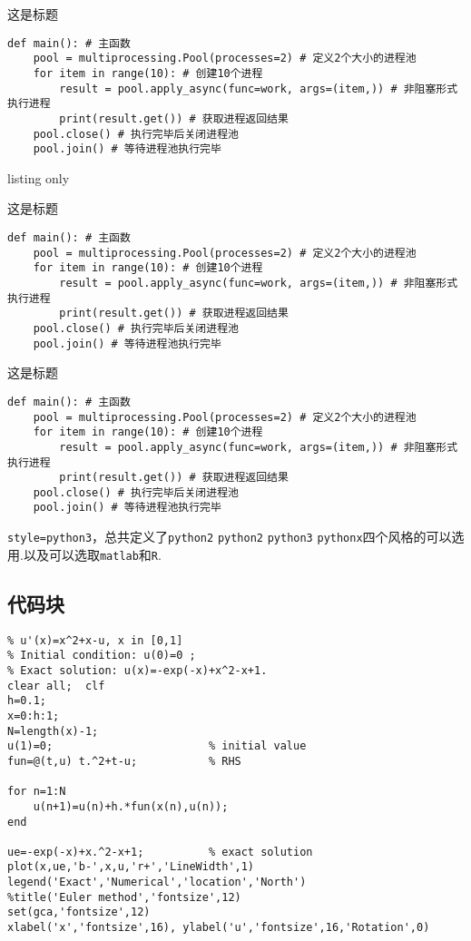 \documentclass[a4]{ctexart}
\begin{document}
\begin{macbox}{这是标题}
\begin{lstlisting}[style=python4]
def main(): # 主函数
    pool = multiprocessing.Pool(processes=2) # 定义2个大小的进程池
    for item in range(10): # 创建10个进程
        result = pool.apply_async(func=work, args=(item,)) # 非阻塞形式执行进程
        print(result.get()) # 获取进程返回结果
    pool.close() # 执行完毕后关闭进程池
    pool.join() # 等待进程池执行完毕
\end{lstlisting}
\end{macbox}

\begin{tcblisting}{listing only}
\begin{macboxd}{这是标题}
\begin{lstlisting}[style=python3]
def main(): # 主函数
    pool = multiprocessing.Pool(processes=2) # 定义2个大小的进程池
    for item in range(10): # 创建10个进程
        result = pool.apply_async(func=work, args=(item,)) # 非阻塞形式执行进程
        print(result.get()) # 获取进程返回结果
    pool.close() # 执行完毕后关闭进程池
    pool.join() # 等待进程池执行完毕
\end{lstlisting}
\end{macboxd}
\end{tcblisting}

\begin{macboxd}{这是标题}
\begin{lstlisting}[style=python3]
def main(): # 主函数
    pool = multiprocessing.Pool(processes=2) # 定义2个大小的进程池
    for item in range(10): # 创建10个进程
        result = pool.apply_async(func=work, args=(item,)) # 非阻塞形式执行进程
        print(result.get()) # 获取进程返回结果
    pool.close() # 执行完毕后关闭进程池
    pool.join() # 等待进程池执行完毕
\end{lstlisting}
\end{macboxd}
\verb*|style=python3|，总共定义了\verb*|python2| \verb*|python2| \verb*|python3| \verb*|pythonx|四个风格的可以选用.以及可以选取\verb*|matlab|和\verb*|R|.
\subsection{代码块}

\begin{lstlisting}[style=matlab,title={MATLAB code}]
% Euler method for the ODE model
% u'(x)=x^2+x-u, x in [0,1]
% Initial condition: u(0)=0 ;
% Exact solution: u(x)=-exp(-x)+x^2-x+1.
clear all;  clf
h=0.1;
x=0:h:1;
N=length(x)-1;
u(1)=0;                        % initial value
fun=@(t,u) t.^2+t-u;           % RHS

for n=1:N
    u(n+1)=u(n)+h.*fun(x(n),u(n));
end

ue=-exp(-x)+x.^2-x+1;          % exact solution
plot(x,ue,'b-',x,u,'r+','LineWidth',1)
legend('Exact','Numerical','location','North')
%title('Euler method','fontsize',12)
set(gca,'fontsize',12)
xlabel('x','fontsize',16), ylabel('u','fontsize',16,'Rotation',0)
\end{lstlisting}
\end{document}
